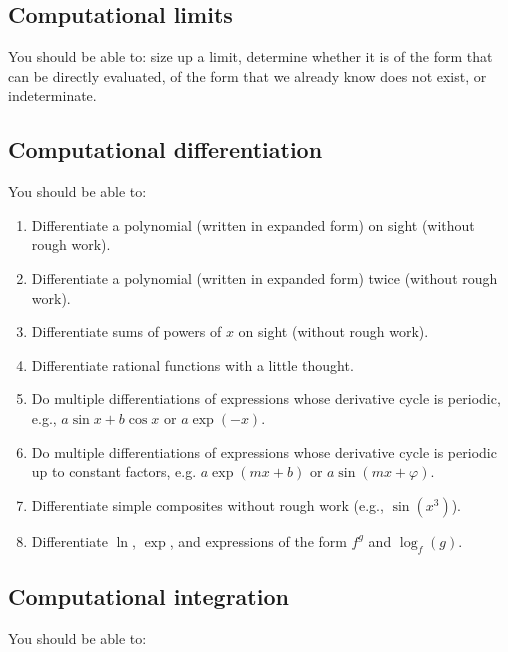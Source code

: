 \documentclass[10pt]{amsart}
\begin{document}
\subsection{Computational limits}

You should be able to: size up a limit, determine whether it is of the
form that can be directly evaluated, of the form that we already know
does not exist, or indeterminate.

\subsection{Computational differentiation}

You should be able to:

\begin{enumerate}
\item Differentiate a polynomial (written in expanded form) on sight
  (without rough work).
\item Differentiate a polynomial (written in expanded form) twice
  (without rough work).
\item Differentiate sums of powers of $x$ on sight (without rough
  work).
\item Differentiate rational functions with a little thought.
\item Do multiple differentiations of expressions whose derivative
  cycle is periodic, e.g., $a \sin x + b \cos x$ or $a \exp(-x)$.
\item Do multiple differentiations of expressions whose derivative
  cycle is periodic up to constant factors, e.g. $a \exp(mx + b)$ or $a
  \sin(mx + \varphi)$.
\item Differentiate simple composites without rough work (e.g.,
  $\sin(x^3)$).
\item Differentiate $\ln$, $\exp$, and expressions of the form $f^g$
  and $\log_f(g)$.
\end{enumerate}

\subsection{Computational integration}

You should be able to:
\end{document}
